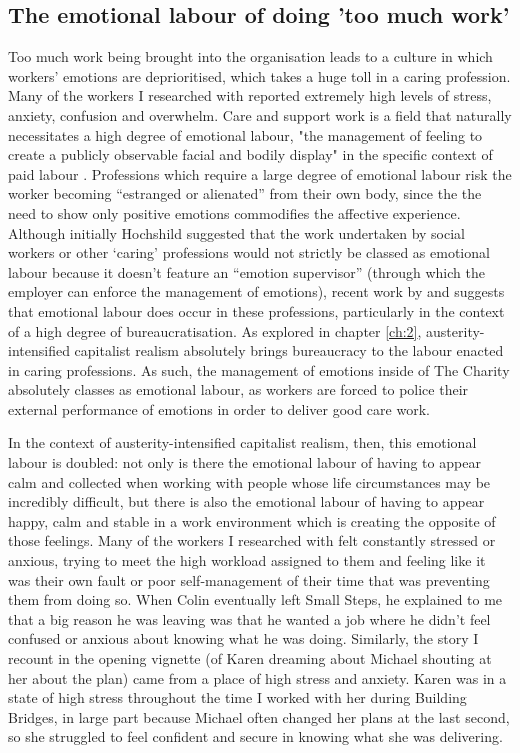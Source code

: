 \subsection{The emotional labour of doing 'too much work'}
Too much work being brought into the organisation leads to a culture in which workers' emotions are deprioritised, which takes a huge toll in a caring profession. Many of the workers I researched with reported extremely high levels of stress, anxiety, confusion and overwhelm. Care and support work is a field that naturally necessitates a high degree of emotional labour, "the management of feeling to create a publicly observable facial and bodily display" in the specific context of paid labour \citep[7]{hochschild_managed_2012}. Professions which require a large degree of emotional labour risk the worker becoming “estranged or alienated” from their own body, since the the need to show only positive emotions commodifies the affective experience. Although initially Hochshild suggested that the work undertaken by social workers or other ‘caring’ professions would not strictly be classed as emotional labour because it doesn’t feature an “emotion supervisor” (through which the employer can enforce the management of emotions), recent work by \citet{leeson_emotional_2010} and \citet{winter_emotional_2018} suggests that emotional labour does occur in these professions, particularly in the context of a high degree of bureaucratisation. As explored in chapter \ref{ch:2}, austerity-intensified capitalist realism absolutely brings bureaucracy to the labour enacted in caring professions. As such, the management of emotions inside of The Charity absolutely classes as emotional labour, as workers are forced to police their external performance of emotions in order to deliver good care work.

In the context of austerity-intensified capitalist realism, then, this emotional labour is doubled: not only is there the emotional labour of having to appear calm and collected when working with people whose life circumstances may be incredibly difficult, but there is also the emotional labour of having to appear happy, calm and stable in a work environment which is creating the opposite of those feelings. Many of the workers I researched with felt constantly stressed or anxious, trying to meet the high workload assigned to them and feeling like it was their own fault or poor self-management of their time that was preventing them from doing so. When Colin eventually left Small Steps, he explained to me that a big reason he was leaving was that he wanted a job where he didn't feel confused or anxious about knowing what he was doing. Similarly, the story I recount in the opening vignette (of Karen dreaming about Michael shouting at her about the plan) came from a place of high stress and anxiety. Karen was in a state of high stress throughout the time I worked with her during Building Bridges, in large part because Michael often changed her plans at the last second, so she struggled to feel confident and secure in knowing what she was delivering.

